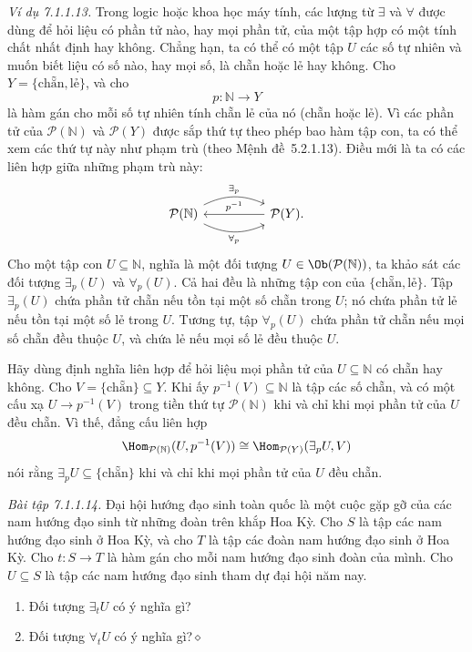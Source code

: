 \noindent\textit{Ví dụ 7.1.1.13.}\keepwithnext
Trong logic hoặc khoa học máy tính, các lượng từ $\exists$ và $\forall$ được dùng để hỏi liệu có phần tử nào, hay mọi phần tử, của một tập hợp có một tính chất nhất định hay không. Chẳng hạn, ta có thể có một tập $U$ các số tự nhiên và muốn biết liệu có số nào, hay mọi số, là chẵn hoặc lẻ hay không. Cho $Y=\{\text{chẵn},\text{lẻ}\}$, và cho
\[
p:\mathbb N\longrightarrow Y
\]
là hàm gán cho mỗi số tự nhiên tính chẵn lẻ của nó (chẵn hoặc lẻ). Vì các phần tử của $\mathcal P(\mathbb N)$ và $\mathcal P(Y)$ được sắp thứ tự theo phép bao hàm tập con, ta có thể xem các thứ tự này như phạm trù (theo Mệnh đề~5.2.1.13). Điều mới là ta có các liên hợp giữa những phạm trù này:
\[
\begin{tikzcd}[column sep=huge]
\mathcal P(\mathbb N)\arrow[r,bend left=25,"\exists_p"]\arrow[r,bend right=25,"\forall_p"']&\mathcal P(Y)\arrow[l,"p^{-1}"'].
\end{tikzcd}
\]
Cho một tập con $U\subseteq\mathbb N$, nghĩa là một đối tượng $U\in\Ob(\mathcal P(\mathbb N))$, ta khảo sát các đối tượng $\exists_p(U)$ và $\forall_p(U)$. Cả hai đều là những tập con của $\{\text{chẵn},\text{lẻ}\}$. Tập $\exists_p(U)$ chứa phần tử chẵn nếu tồn tại một số chẵn trong $U$; nó chứa phần tử lẻ nếu tồn tại một số lẻ trong $U$. Tương tự, tập $\forall_p(U)$ chứa phần tử chẵn nếu mọi số chẵn đều thuộc $U$, và chứa lẻ nếu mọi số lẻ đều thuộc $U$.

Hãy dùng định nghĩa liên hợp để hỏi liệu mọi phần tử của $U\subseteq\mathbb N$ có chẵn hay không. Cho $V=\{\text{chẵn}\}\subseteq Y$. Khi ấy $p^{-1}(V)\subseteq\mathbb N$ là tập các số chẵn, và có một cấu xạ $U\to p^{-1}(V)$ trong tiền thứ tự $\mathcal P(\mathbb N)$ khi và chỉ khi mọi phần tử của $U$ đều chẵn. Vì thế, đẳng cấu liên hợp
\[
\Hom_{\mathcal P(\mathbb N)}(U,p^{-1}(V))\cong\Hom_{\mathcal P(Y)}(\exists_p U,V)
\]
nói rằng $\exists_p U\subseteq\{\text{chẵn}\}$ khi và chỉ khi mọi phần tử của $U$ đều chẵn.

\noindent\textit{Bài tập 7.1.1.14.}\keepwithnext
Đại hội hướng đạo sinh toàn quốc là một cuộc gặp gỡ của các nam hướng đạo sinh từ những đoàn trên khắp Hoa Kỳ. Cho $S$ là tập các nam hướng đạo sinh ở Hoa Kỳ, và cho $T$ là tập các đoàn nam hướng đạo sinh ở Hoa Kỳ. Cho $t:S\to T$ là hàm gán cho mỗi nam hướng đạo sinh đoàn của mình. Cho $U\subseteq S$ là tập các nam hướng đạo sinh tham dự đại hội năm nay.
\begin{enumerate}[label=\alph*.]
\item Đối tượng $\exists_t U$ có ý nghĩa gì?
\item Đối tượng $\forall_t U$ có ý nghĩa gì?\unskip\nobreak\hfill\mbox{$\diamond$}\par
\end{enumerate}

